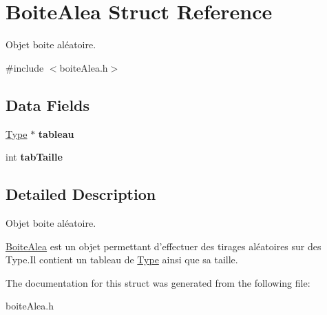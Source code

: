 \hypertarget{struct_boite_alea}{\section{Boite\+Alea Struct Reference}
\label{struct_boite_alea}
}


Objet boite aléatoire.  




{\ttfamily \#include $<$boite\+Alea.\+h$>$}

\subsection*{Data Fields}
\begin{DoxyCompactItemize}
\item 
\hypertarget{struct_boite_alea_acc42f7fc588550c9d51054f318a7aa89}{\hyperlink{struct_type}{Type} $\ast$ {\bfseries tableau}}\label{struct_boite_alea_acc42f7fc588550c9d51054f318a7aa89}

\item 
\hypertarget{struct_boite_alea_a46b8029f8b7dac15f55458d072a3245d}{int {\bfseries tab\+Taille}}\label{struct_boite_alea_a46b8029f8b7dac15f55458d072a3245d}

\end{DoxyCompactItemize}


\subsection{Detailed Description}
Objet boite aléatoire. 

\hyperlink{struct_boite_alea}{Boite\+Alea} est un objet permettant d'effectuer des tirages aléatoires sur des Type.\+Il contient un tableau de \hyperlink{struct_type}{Type} ainsi que sa taille. 

The documentation for this struct was generated from the following file\+:\begin{DoxyCompactItemize}
\item 
boite\+Alea.\+h\end{DoxyCompactItemize}
